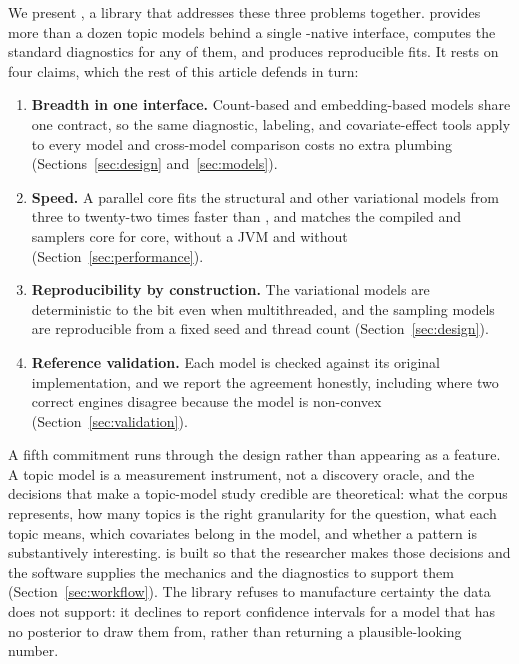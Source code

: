 \documentclass[article,nojss]{jss}
\begin{document}
We present , a  library that addresses these three
problems together.  provides more than a dozen topic models behind a
single -native interface, computes the standard diagnostics for any of
them, and produces reproducible fits. It rests on four claims, which the rest of
this article defends in turn:

\begin{enumerate}
\item \textbf{Breadth in one interface.} Count-based and embedding-based models
share one contract, so the same diagnostic, labeling, and covariate-effect tools
apply to every model and cross-model comparison costs no extra plumbing
(Sections~\ref{sec:design} and~\ref{sec:models}).
\item \textbf{Speed.} A parallel  core fits the structural and
other variational models from three to twenty-two times faster than 
, and matches the compiled  and  samplers core
for core, without a JVM and without  (Section~\ref{sec:performance}).
\item \textbf{Reproducibility by construction.} The variational models are
deterministic to the bit even when multithreaded, and the sampling models are
reproducible from a fixed seed and thread count (Section~\ref{sec:design}).
\item \textbf{Reference validation.} Each model is checked against its original
implementation, and we report the agreement honestly, including where two correct
engines disagree because the model is non-convex (Section~\ref{sec:validation}).
\end{enumerate}

A fifth commitment runs through the design rather than appearing as a feature.
A topic model is a measurement instrument, not a discovery oracle, and the
decisions that make a topic-model study credible are theoretical: what the corpus
represents, how many topics is the right granularity for the question, what each
topic means, which covariates belong in the model, and whether a pattern is
substantively interesting.  is built so that the researcher makes
those decisions and the software supplies the mechanics and the diagnostics
to support them (Section~\ref{sec:workflow}). The library refuses to
manufacture certainty the data does not support: it declines to report confidence
intervals for a model that has no posterior to draw them from, rather than
returning a plausible-looking number.
\end{document}
